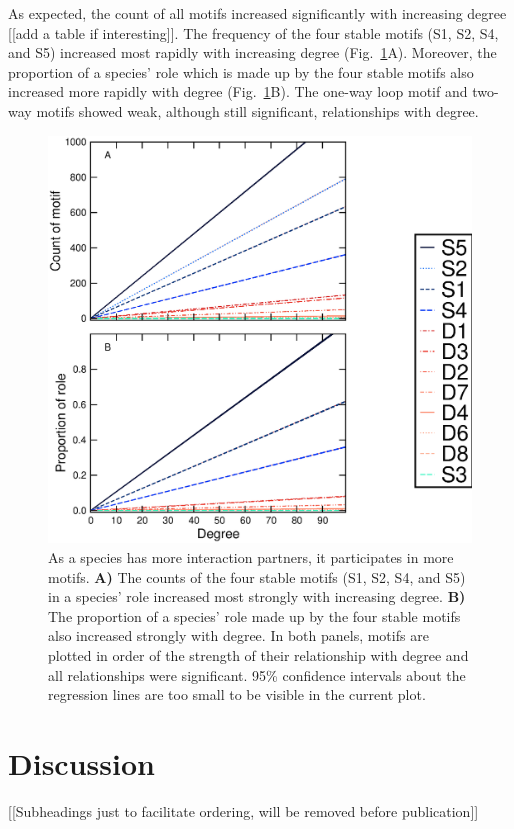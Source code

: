 \documentclass[12pt]{article}
\begin{document}
		As expected, the count of all motifs increased significantly with increasing degree [[add a table if interesting]].
		The frequency of the four stable motifs (S1, S2, S4, and S5) increased most rapidly with increasing degree (Fig.~\ref{motif_vs_degree}A).
		Moreover, the proportion of a species' role which is made up by the four stable motifs also increased more rapidly with degree (Fig.~\ref{motif_vs_degree}B).
		The one-way loop motif and two-way motifs showed weak, although still significant, relationships with degree.


		\begin{figure}[hb!]
			\caption{As a species has more interaction partners, it participates in more motifs. \textbf{A)} The counts of the four stable motifs (S1, S2, S4, and S5) in a species' role increased most strongly with increasing degree. \textbf{B)} The proportion of a species' role made up by the four stable motifs also increased strongly with degree. In both panels, motifs are plotted in order of the strength of their relationship with degree and all relationships were significant. 95\% confidence intervals about the regression lines are too small to be visible in the current plot.}
			\label{motif_vs_degree}
			\includegraphics[width=.75\textwidth]{figures/roles/motif_vs_degree.eps}
			\end{figure}


\section{Discussion}

	[[Subheadings just to facilitate ordering, will be removed before publication]]
\end{document}
